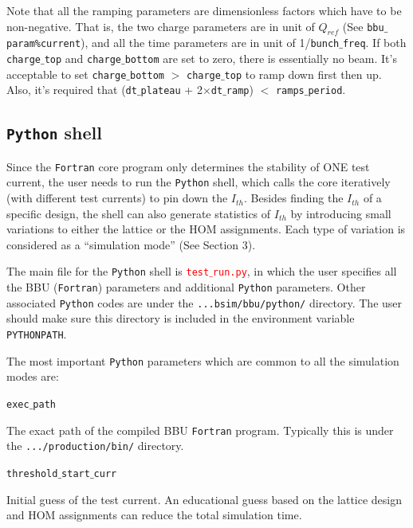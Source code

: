 \documentclass{article}
\begin{document}
Note that all the ramping parameters are dimensionless factors which have to be non-negative. That is, the two charge parameters are in unit of $Q_{ref}$ (See \texttt{bbu$\_$param\%current}), and all the time parameters are in unit of 1/\texttt{bunch$\_$freq}. If both \texttt{charge$\_$top} and \texttt{charge$\_$bottom} are set to zero, there is essentially no beam. It's acceptable to set \texttt{charge$\_$bottom} $>$ \texttt{charge$\_$top} to ramp down first then up. Also, it's required that (\texttt{dt$\_$plateau} + 2$\times$\texttt{dt$\_$ramp}) $<$ \texttt{ramps$\_$period}.  



\subsection{\texttt{Python} shell}
Since the \texttt{Fortran} core program only determines the stability of ONE test current, the user needs to run the \texttt{Python} shell, which calls the core iteratively (with different test currents) to pin down the $I_{th}$. 
Besides finding the $I_{th}$ of a specific design, the shell can also generate statistics of $I_{th}$ by introducing small variations to either the lattice or the HOM assignments. Each type of variation is considered as a ``simulation mode'' (See Section 3). 

The main file for the \texttt{Python} shell is \textcolor{red}{\texttt{test$\_$run.py}}, in which the user specifies all the BBU (\texttt{Fortran}) parameters and additional \texttt{Python} parameters. Other associated \texttt{Python} codes are under the \texttt{...bsim/bbu/python/} directory. The user should make sure this directory is included in the environment variable \texttt{PYTHONPATH}.

\bigbreak 

The most important \texttt{Python} parameters which are common to all the simulation modes are:

\bigbreak
\hspace*{-2cm}
\texttt{exec$\_$path}

\noindent
The exact path of the compiled BBU \texttt{Fortran} program. Typically this is under the \texttt{.../production/bin/} directory. 


\bigbreak
\hspace*{-2cm}
\texttt{threshold$\_$start$\_$curr}

\noindent
Initial guess of the test current. An educational guess based on the lattice design and HOM assignments can reduce the total simulation time. 
\end{document}
